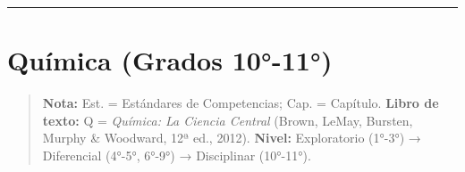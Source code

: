 \documentclass[
  spanish,
  letterpaper,
  12pt,
  oneside,
  open=any,
  DIV=15]{scrbook}
\begin{document}
\begin{center}\rule{0.5\linewidth}{0.5pt}\end{center}

\section{Química (Grados 10°-11°)}\label{quuxedmica-grados-10-11}

\begin{quote}
\textbf{Nota:} Est. = Estándares de Competencias; Cap. = Capítulo.
\textbf{Libro de texto:} Q = \emph{Química: La Ciencia Central} (Brown,
LeMay, Bursten, Murphy \& Woodward, 12ª ed., 2012). \textbf{Nivel:}
Exploratorio (1°-3°) → Diferencial (4°-5°, 6°-9°) → Disciplinar
(10°-11°).
\end{quote}
\end{document}
